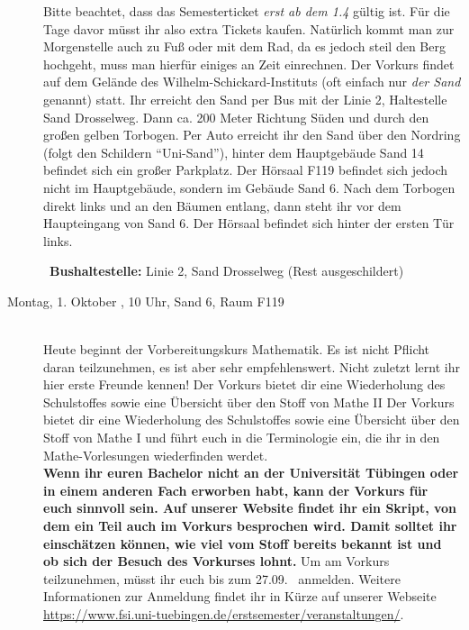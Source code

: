 \begin{description}
\ifsommersemester
Bitte beachtet, dass das Semesterticket \emph{erst ab dem 1.4} gültig ist. Für die Tage davor müsst ihr also extra Tickets kaufen. Natürlich kommt man zur Morgenstelle auch zu Fuß oder mit dem Rad, da es jedoch steil den Berg hochgeht, muss man hierfür einiges an Zeit einrechnen.
\fi
Der Vorkurs findet auf dem Gelände des Wilhelm-Schickard-Instituts (oft einfach nur \emph{der Sand} genannt) statt. Ihr erreicht den Sand per Bus mit der Linie 2, Haltestelle Sand Drosselweg. Dann ca. 200 Meter Richtung Süden und durch den großen gelben Torbogen. Per Auto erreicht ihr den Sand über den Nordring (folgt den Schildern "`Uni-Sand"'), hinter dem Hauptgebäude Sand 14 befindet sich ein großer Parkplatz. Der Hörsaal F119 befindet sich jedoch nicht im Hauptgebäude, sondern im Gebäude Sand 6. Nach dem Torbogen direkt links und an den Bäumen entlang, dann steht ihr vor dem Haupteingang von Sand 6. Der Hörsaal befindet sich hinter der ersten Tür links.

~\textbf{Bushaltestelle:} Linie 2, Sand Drosselweg (Rest ausgeschildert)
\fi


\else
\item[Montag, 1. Oktober \YEAR, 10 Uhr, Sand 6, Raum F119]\ \\
Heute beginnt der Vorbereitungskurs Mathematik. Es ist nicht Pflicht daran teilzunehmen,
es ist aber sehr empfehlenswert. Nicht zuletzt lernt ihr hier erste Freunde kennen!
\ifsommersemester
Der Vorkurs bietet dir eine Wiederholung des Schulstoffes sowie eine Übersicht über den Stoff von Mathe II
\fi
\ifwintersemester
Der Vorkurs bietet dir eine Wiederholung des Schulstoffes sowie eine Übersicht über den Stoff von Mathe I
\fi
und führt euch in die Terminologie ein, die ihr in den Mathe-Vorlesungen wiederfinden werdet.
\ifmaster
\\
\textbf{Wenn ihr euren Bachelor nicht an der Universität Tübingen oder in einem anderen Fach erworben habt, kann der Vorkurs für euch sinnvoll sein. Auf unserer Website findet ihr ein Skript, von dem ein Teil auch im Vorkurs besprochen wird. Damit solltet ihr einschätzen können, wie viel vom Stoff bereits bekannt ist und ob sich der Besuch des Vorkurses lohnt.}
\fi
Um am Vorkurs teilzunehmen, müsst ihr euch bis zum 27.09. \YEAR~anmelden. Weitere Informationen zur Anmeldung findet ihr in Kürze auf unserer Webseite \url{https://www.fsi.uni-tuebingen.de/erstsemester/veranstaltungen/}.


\end{description}
